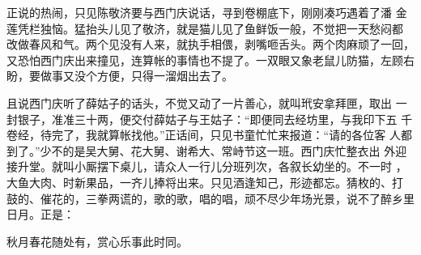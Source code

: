 正说的热闹，只见陈敬济要与西门庆说话，寻到卷棚底下，刚刚凑巧遇着了潘
金莲凭栏独恼。猛抬头儿见了敬济，就是猫儿见了鱼鲜饭一般，不觉把一天愁闷都
改做春风和气。两个见没有人来，就执手相偎，剥嘴咂舌头。两个肉麻顽了一回，
又恐怕西门庆出来撞见，连算帐的事情也不提了。一双眼又象老鼠儿防猫，左顾右
盼，要做事又没个方便，只得一溜烟出去了。

且说西门庆听了薛姑子的话头，不觉又动了一片善心，就叫玳安拿拜匣，取出
一封银子，准准三十两，便交付薛姑子与王姑子：“即便同去经坊里，与我印下五
千卷经，待完了，我就算帐找他。”正话间，只见书童忙忙来报道：“请的各位客
人都到了。”少不的是吴大舅、花大舅、谢希大、常峙节这一班。西门庆忙整衣出
外迎接升堂。就叫小厮摆下桌儿，请众人一行儿分班列次，各叙长幼坐的。不一时
，大鱼大肉、时新果品，一齐儿捧将出来。只见酒逢知己，形迹都忘。猜枚的、打
鼓的、催花的，三拳两谎的，歌的歌，唱的唱，顽不尽少年场光景，说不了醉乡里
日月。正是：

秋月春花随处有，赏心乐事此时同。